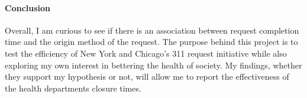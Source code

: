 \documentclass[12pt]{article}
\begin{document}
\paragraph{Conclusion}
Overall, I am curious to see if there is an association between request completion time and the origin method of the request. 
The purpose behind this project is to test the efficiency of New York and Chicago’s 311 request initiative while also exploring my own interest in bettering the health of society. 
My findings, whether they support my hypothesis or not, will allow me to report the effectiveness of the health departments closure times. 



\end{document}
